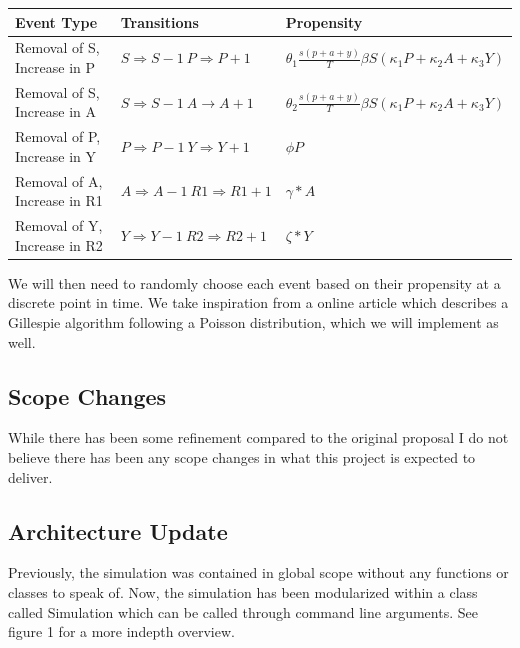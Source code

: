 \documentclass{article}
\begin{document}
\begin{center}
  \begin{tabular}{|l | l | l |}
    \hline
    Event Type                   & Transitions                                    & Propensity                                                                       \\ [0.5ex]
    \hline\hline
    Removal of S, Increase in P  & $S \Rightarrow S - 1 \> P \Rightarrow P + 1$   & $\theta _1 \frac{s(p+a+y)}{T} \beta S (\kappa _1 P + \kappa _2 A + \kappa _3 Y)$ \\
    \hline
    Removal of S, Increase in A  & $S \Rightarrow S - 1 \> A \rightarrow A + 1$   & $ \theta _2 \frac{s(p+a+y)}{T} \beta S (\kappa _1 P + \kappa _2 A+ \kappa _3 Y)$ \\
    \hline

    Removal of P, Increase in Y  & $P \Rightarrow P - 1 \> Y \Rightarrow Y + 1$   & $\phi P$                                                                         \\
    \hline
    Removal of A, Increase in R1 & $A \Rightarrow A - 1 \> R1 \Rightarrow R1 + 1$ & $\gamma * A$                                                                     \\
    \hline
    Removal of Y, Increase in R2 & $Y \Rightarrow Y - 1 \> R2 \Rightarrow R2 + 1$ & $\zeta * Y$                                                                      \\
    \hline
  \end{tabular}
\end{center}

We will then need to randomly choose each event based on their propensity at a discrete point in time. We take inspiration from a online article which describes a Gillespie algorithm following a Poisson distribution, which we will implement as well.
\cite{gillespie}

\subsection{Scope Changes}
While there has been some refinement compared to the original proposal I do not believe there has been any scope changes in what this project is expected to deliver.

\subsection{Architecture Update}
Previously, the simulation was contained in global scope without any functions or classes to speak of. Now, the simulation has been modularized within a class called Simulation which can be called through command line arguments. See figure 1 for a more indepth overview.
\end{document}
